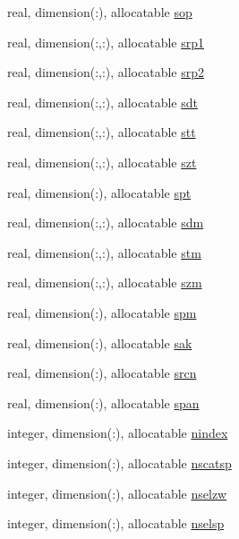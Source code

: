\begin{DoxyCompactItemize}
\item 
real, dimension(\-:), allocatable \hyperlink{classpumamod_ad94d9ab7dd97c7f24ccfca4e9c1dcadd}{sop}
\item 
real, dimension(\-:,\-:), allocatable \hyperlink{classpumamod_a610ade488da8477514d377f4d3113078}{srp1}
\item 
real, dimension(\-:,\-:), allocatable \hyperlink{classpumamod_aedc7ade1364d2e510fe5a9e17d2ee551}{srp2}
\item 
real, dimension(\-:,\-:), allocatable \hyperlink{classpumamod_a6469b0773780c7e85cc8fe80dab7360c}{sdt}
\item 
real, dimension(\-:,\-:), allocatable \hyperlink{classpumamod_a38a8cfb3cd3b1ccf0fd5b7283e0949be}{stt}
\item 
real, dimension(\-:,\-:), allocatable \hyperlink{classpumamod_a9414c9820ee505006ea2ef90a1e4786c}{szt}
\item 
real, dimension(\-:), allocatable \hyperlink{classpumamod_a86dd88d1dc1d0d21eeb13c11905d7b66}{spt}
\item 
real, dimension(\-:,\-:), allocatable \hyperlink{classpumamod_a4285b7b3267876729285e16aca07035e}{sdm}
\item 
real, dimension(\-:,\-:), allocatable \hyperlink{classpumamod_a636c3a27cc6a7aa8f63fd4d322406517}{stm}
\item 
real, dimension(\-:,\-:), allocatable \hyperlink{classpumamod_a7961c979cb0a5cb3cfb7cce5a9d16d6b}{szm}
\item 
real, dimension(\-:), allocatable \hyperlink{classpumamod_a2bc3d91e2e9c16048446dbd12448ed2d}{spm}
\item 
real, dimension(\-:), allocatable \hyperlink{classpumamod_ae752a8854b0014c33704f7390b78687d}{sak}
\item 
real, dimension(\-:), allocatable \hyperlink{classpumamod_a98103b850b9c24c95bac646961ae0209}{srcn}
\item 
real, dimension(\-:), allocatable \hyperlink{classpumamod_aaf3b11d526905c319b065f60804ba566}{span}
\item 
integer, dimension(\-:), allocatable \hyperlink{classpumamod_a7902698a1673a4c65dd8e7443a7fcc6f}{nindex}
\item 
integer, dimension(\-:), allocatable \hyperlink{classpumamod_a8a778542c0d1ac00f0d4ccffe08f7190}{nscatsp}
\item 
integer, dimension(\-:), allocatable \hyperlink{classpumamod_a14bc87e591fb027289ef3d9eb40b8a70}{nselzw}
\item 
integer, dimension(\-:), allocatable \hyperlink{classpumamod_a4f4aaa4c774bb1500caa0de7ca16bbe8}{nselsp}

\end{DoxyCompactItemize}
